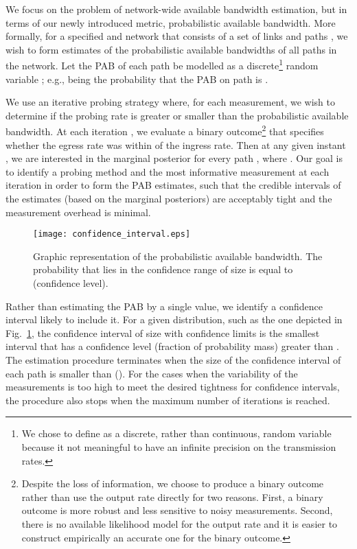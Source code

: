 \documentclass[final,5p,times,twocolumn]{elsarticle}
\begin{document}
We focus on the problem of network-wide available bandwidth estimation, but in terms of our newly introduced metric, probabilistic available bandwidth.  More formally, for a specified  and network that consists of a set of  links  and  paths , we wish to form estimates of the probabilistic available bandwidths of all paths in the network.  Let the PAB of each path  be modelled as a discrete\footnote{We chose to define  as a discrete, rather than continuous, random variable because it  not meaningful to have an infinite precision on the transmission rates.} random variable ; e.g.,  being the probability that the PAB on path  is .  

We use an iterative probing strategy where, for each measurement, we wish to determine if the probing rate is greater or smaller than the probabilistic available bandwidth.  At each iteration , we evaluate a binary outcome\footnote{Despite the loss of information, we choose to produce a binary outcome rather than use the output rate directly for two reasons.  First, a binary outcome is more robust and less sensitive to noisy measurements.  Second, there is no available likelihood model for the output rate and it is easier to construct empirically an accurate one for the binary outcome.}  that specifies whether the egress rate was within  of the ingress rate.  Then at any given instant , we are interested in the marginal posterior  for every path , where .  Our goal is to identify a probing method and the most informative measurement at each iteration in order to form the PAB estimates, such that the credible intervals of the estimates (based on the marginal posteriors) are acceptably tight and the measurement overhead is minimal.

\begin{figure}[!h]
	\centering
	\texttt{[image: confidence\_interval.eps]}
	\caption{Graphic representation of the probabilistic available bandwidth.  The probability that  lies in the confidence range  of size  is equal to  (confidence level).
\label{fig:confidence_interval}}
\end{figure}

Rather than estimating the PAB by a single value, we identify a confidence interval likely to include it.  For a given distribution, such as the one depicted in Fig.~\ref{fig:confidence_interval}, the confidence interval of size  with confidence limits  is the smallest interval that has a confidence level (fraction of probability mass) greater than .  The estimation procedure terminates when the size of the confidence interval of each path is smaller than  ().  For the cases when the variability of the measurements is too high to meet the desired tightness for confidence intervals, the procedure also stops when the maximum number of iterations is reached.
\end{document}
